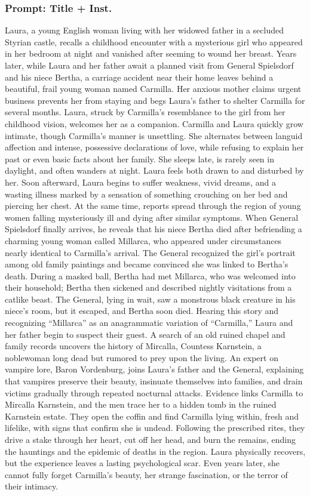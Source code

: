 \documentclass{article} %
\begin{document}
\subsubsection{Prompt: Title + Inst.}

Laura, a young English woman living with her widowed father in a secluded Styrian castle, recalls a childhood encounter with a mysterious girl who appeared in her bedroom at night and vanished after seeming to wound her breast. Years later, while Laura and her father await a planned visit from General Spielsdorf and his niece Bertha, a carriage accident near their home leaves behind a beautiful, frail young woman named Carmilla. Her anxious mother claims urgent business prevents her from staying and begs Laura’s father to shelter Carmilla for several months. Laura, struck by Carmilla’s resemblance to the girl from her childhood vision, welcomes her as a companion. Carmilla and Laura quickly grow intimate, though Carmilla’s manner is unsettling. She alternates between languid affection and intense, possessive declarations of love, while refusing to explain her past or even basic facts about her family. She sleeps late, is rarely seen in daylight, and often wanders at night. Laura feels both drawn to and disturbed by her. Soon afterward, Laura begins to suffer weakness, vivid dreams, and a wasting illness marked by a sensation of something crouching on her bed and piercing her chest. At the same time, reports spread through the region of young women falling mysteriously ill and dying after similar symptoms. When General Spielsdorf finally arrives, he reveals that his niece Bertha died after befriending a charming young woman called Millarca, who appeared under circumstances nearly identical to Carmilla’s arrival. \textcolor{skipred}{The General recognized the girl’s portrait among old family paintings and became convinced she was linked to Bertha’s death.} During a masked ball, Bertha had met Millarca, who was welcomed into their household; Bertha then sickened and described nightly visitations from a catlike beast. The General, lying in wait, saw a monstrous black creature in his niece’s room, but it escaped, and Bertha soon died. Hearing this story and recognizing “Millarca” as an anagrammatic variation of “Carmilla,” Laura and her father begin to suspect their guest. A search of an old ruined chapel and family records uncovers the history of Mircalla, Countess Karnstein, a noblewoman long dead but rumored to prey upon the living. An expert on vampire lore, Baron Vordenburg, joins Laura’s father and the General, explaining that vampires preserve their beauty, insinuate themselves into families, and drain victims gradually through repeated nocturnal attacks. Evidence links Carmilla to Mircalla Karnstein, and the men trace her to a hidden tomb in the ruined Karnstein estate. They open the coffin and find Carmilla lying within, fresh and lifelike, with signs that confirm she is undead. Following the prescribed rites, they drive a stake through her heart, cut off her head, and burn the remains, ending the hauntings and the epidemic of deaths in the region. Laura physically recovers, but the experience leaves a lasting psychological scar. Even years later, she cannot fully forget Carmilla’s beauty, her strange fascination, or the terror of their intimacy.
\end{document}
